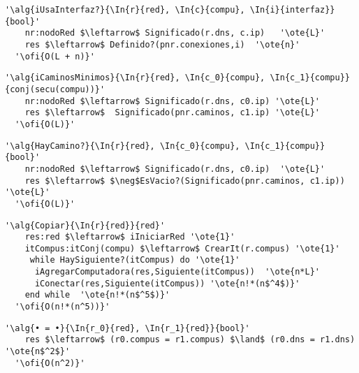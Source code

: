 \begin{lstlisting}[mathescape]
  '\alg{iUsaInterfaz?}{\In{r}{red}, \In{c}{compu}, \In{i}{interfaz}}{bool}'
    nr:nodoRed $\leftarrow$ Significado(r.dns, c.ip)   '\ote{L}'
    res $\leftarrow$ Definido?(pnr.conexiones,i)  '\ote{n}'
  '\ofi{O(L + n)}'
\end{lstlisting}

\begin{lstlisting}[mathescape]
  '\alg{iCaminosMinimos}{\In{r}{red}, \In{c_0}{compu}, \In{c_1}{compu}}{conj(secu(compu))}'
    nr:nodoRed $\leftarrow$ Significado(r.dns, c0.ip) '\ote{L}'
    res $\leftarrow$  Significado(pnr.caminos, c1.ip) '\ote{L}'
  '\ofi{O(L)}'
\end{lstlisting}

\begin{lstlisting}[mathescape]
  '\alg{HayCamino?}{\In{r}{red}, \In{c_0}{compu}, \In{c_1}{compu}}{bool}'
    nr:nodoRed $\leftarrow$ Significado(r.dns, c0.ip)  '\ote{L}'
    res $\leftarrow$ $\neg$EsVacio?(Significado(pnr.caminos, c1.ip))  '\ote{L}'                                       
  '\ofi{O(L)}'
\end{lstlisting}

\begin{lstlisting}[mathescape]
  '\alg{Copiar}{\In{r}{red}}{red}'
    res:red $\leftarrow$ iIniciarRed '\ote{1}' 
    itCompus:itConj(compu) $\leftarrow$ CrearIt(r.compus) '\ote{1}'
     while HaySiguiente?(itCompus) do '\ote{1}'                                                 
      iAgregarComputadora(res,Siguiente(itCompus))  '\ote{n*L}'
      iConectar(res,Siguiente(itCompus)) '\ote{n!*(n$^4$)}'
    end while  '\ote{n!*(n$^5$)}'                              
  '\ofi{O(n!*(n^5))}'
\end{lstlisting}

\begin{lstlisting}[mathescape]
  '\alg{• = •}{\In{r_0}{red}, \In{r_1}{red}}{bool}'
    res $\leftarrow$ (r0.compus = r1.compus) $\land$ (r0.dns = r1.dns) '\ote{n$^2$}'                          
  '\ofi{O(n^2)}'
\end{lstlisting}


 

